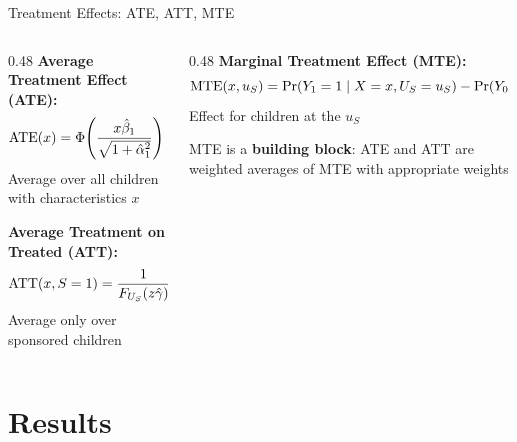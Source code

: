 \documentclass[aspectratio=169, 10pt]{beamer}
\begin{document}
\begin{frame}{Treatment Effects: ATE, ATT, MTE}
  \begin{columns}
    \begin{column}{0.48\textwidth}
      \textbf{Average Treatment Effect (ATE):}
      \[
        \mathrm{ATE}(x) = \Phi\!\left(\frac{x\hat{\beta}_1}{\sqrt{1+\hat{\alpha}_1^2}}\right) - \Phi\!\left(\frac{x\hat{\beta}_0}{\sqrt{1+\hat{\alpha}_0^2}}\right)
      \]
      Average over all children with characteristics $x$

      \vspace{0.6em}
      \textbf{Average Treatment on Treated (ATT):}
      \[
        \mathrm{ATT}(x, S=1) = \frac{1}{F_{U_S}(z\hat{\gamma})} \left[F_{U_S, U_1}(\cdot) - F_{U_S, U_0}(\cdot)\right]
      \]
      Average only over sponsored children
    \end{column}
    \begin{column}{0.48\textwidth}
      \textbf{Marginal Treatment Effect (MTE):}
      \[
        \mathrm{MTE}(x, u_S) = \Pr(Y_1=1 \mid X=x, U_S=u_S) - \Pr(Y_0=1 \mid X=x, U_S=u_S)
      \]
      Effect for children at the  $u_S$

      \vspace{0.4em}
      \begin{keybox}
        \small MTE is a \textbf{building block}: ATE and ATT are weighted averages of MTE with appropriate weights \citep{Heckman2007}
      \end{keybox}
    \end{column}
  \end{columns}
\end{frame}

\section{Results}
\end{document}

